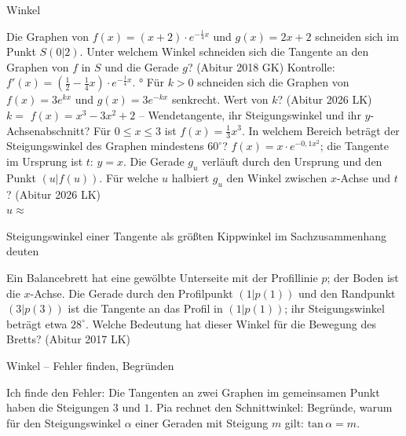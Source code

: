 \begin{aufgabe}{Winkel}
\begin{teile}
\begin{ksys}[xmin=-3,xmax=5,ymin=0,ymax=5]   \end{ksys}
\teil Die Graphen von $f(x) = (x + 2) \cdot e^{-\frac{1}{4}x}$ und $g(x) = 2x + 2$ schneiden sich im Punkt $S(0 | 2)$. Unter welchem Winkel schneiden sich die Tangente an den Graphen von $f$ in $S$ und die Gerade $g$? \hfill (Abitur 2018 GK) Kontrolle: $f'(x) = (\frac{1}{2} - \frac{1}{4}x) \cdot e^{-\frac{1}{4}x}$. \leerfeld °
\teil Für $k > 0$ schneiden sich die Graphen von $f(x) = 3e^{kx}$ und $g(x) = 3e^{-kx}$ senkrecht. Wert von $k$? \hfill (Abitur 2026 LK) \\ $k =$ \leerfeld
\teil $f(x) = x^3 - 3x^2 + 2$ – Wendetangente, ihr Steigungswinkel und ihr $y$-Achsenabschnitt? \leerfeld
\teil Für $0 \le x \le 3$ ist $f(x) = \frac{1}{3}x^3$. In welchem Bereich beträgt der Steigungswinkel des Graphen mindestens $60^\circ$? \leerfeld
\teil $f(x) = x \cdot e^{-0{,}1x^2}$; die Tangente im Ursprung ist $t$: $y = x$. Die Gerade $g_u$ verläuft durch den Ursprung und den Punkt $(u | f(u))$. Für welche $u$ halbiert $g_u$ den Winkel zwischen $x$-Achse und $t$? \hfill (Abitur 2026 LK) \\ $u \approx$ \leerfeld
\end{teile}
\end{aufgabe}

\begin{aufgabe}{Steigungswinkel einer Tangente als größten Kippwinkel im Sachzusammenhang deuten}
\begin{teile}
\teil Ein Balancebrett hat eine gewölbte Unterseite mit der Profillinie $p$; der Boden ist die $x$-Achse. Die Gerade durch den Profilpunkt $(1 | p(1))$ und den Randpunkt $(3 | p(3))$ ist die Tangente an das Profil in $(1 | p(1))$; ihr Steigungswinkel beträgt etwa $28^\circ$. Welche Bedeutung hat dieser Winkel für die Bewegung des Bretts? \hfill (Abitur 2017 LK)
\end{teile}
\end{aufgabe}

\begin{aufgabe}{Winkel – Fehler finden, Begründen}
\begin{teile}
\teil Ich finde den Fehler: Die Tangenten an zwei Graphen im gemeinsamen Punkt haben die Steigungen $3$ und $1$. Pia rechnet den Schnittwinkel: 
\teil Begründe, warum für den Steigungswinkel $\alpha$ einer Geraden mit Steigung $m$ gilt: $\mathrm{tan}\,\alpha = m$.
\end{teile}
\end{aufgabe}
